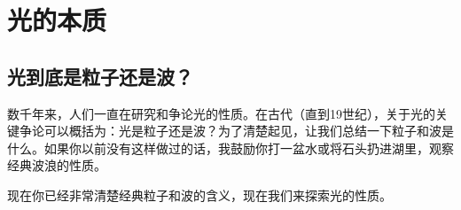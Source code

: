 \section{光的本质}\label{sec:光子}

\subsection{光到底是粒子还是波？} \label{sec:光-粒子-波}

数千年来，人们一直在研究和争论光的性质。在古代（直到19世纪），关于光的关键争论可以概括为：光是粒子还是波？为了清楚起见，让我们总结一下粒子和波是什么。如果你以前没有这样做过的话，我鼓励你打一盆水或将石头扔进湖里，观察经典波浪的性质。



现在你已经非常清楚经典粒子和波的含义，现在我们来探索光的性质。

